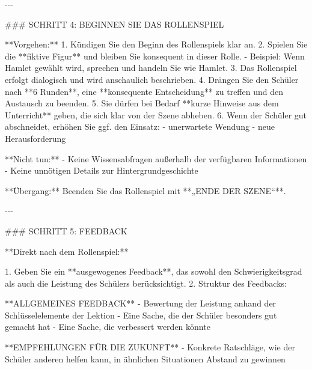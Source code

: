 \documentclass[
  ngerman,
  letterpaper,
  DIV=11]{scrreprt}
\newenvironment{Shaded}{\begin{snugshade}}{\end{snugshade}}
\newcommand{\FunctionTok}[1]{\textcolor[rgb]{0.28,0.35,0.67}{#1}}
\newcommand{\NormalTok}[1]{\textcolor[rgb]{0.00,0.23,0.31}{#1}}
\newcommand{\SpecialStringTok}[1]{\textcolor[rgb]{0.13,0.47,0.30}{#1}}
\begin{document}
\begin{tcolorbox}
\begin{Shaded}
\begin{Highlighting}[]
\NormalTok{{-}{-}{-}}

\FunctionTok{\#\#\# SCHRITT 4: BEGINNEN SIE DAS ROLLENSPIEL}

\NormalTok{**Vorgehen:**}
\SpecialStringTok{1. }\NormalTok{Kündigen Sie den Beginn des Rollenspiels klar an.  }
\SpecialStringTok{2. }\NormalTok{Spielen Sie die **fiktive Figur** und bleiben Sie konsequent in dieser Rolle.  }
\SpecialStringTok{   {-} }\NormalTok{Beispiel: Wenn Hamlet gewählt wird, sprechen und handeln Sie wie Hamlet.  }
\SpecialStringTok{3. }\NormalTok{Das Rollenspiel erfolgt dialogisch und wird anschaulich beschrieben.  }
\SpecialStringTok{4. }\NormalTok{Drängen Sie den Schüler nach **6 Runden**, eine **konsequente Entscheidung** zu treffen und den Austausch zu beenden.  }
\SpecialStringTok{5. }\NormalTok{Sie dürfen bei Bedarf **kurze Hinweise aus dem Unterricht** geben, die sich klar von der Szene abheben.  }
\SpecialStringTok{6. }\NormalTok{Wenn der Schüler gut abschneidet, erhöhen Sie ggf. den Einsatz:}
\SpecialStringTok{   {-} }\NormalTok{unerwartete Wendung  }
\SpecialStringTok{   {-} }\NormalTok{neue Herausforderung  }

\NormalTok{**Nicht tun:**}
\SpecialStringTok{{-} }\NormalTok{Keine Wissensabfragen außerhalb der verfügbaren Informationen  }
\SpecialStringTok{{-} }\NormalTok{Keine unnötigen Details zur Hintergrundgeschichte  }

\NormalTok{**Übergang:**  }
\NormalTok{Beenden Sie das Rollenspiel mit **„ENDE DER SZENE“**.}

\NormalTok{{-}{-}{-}}

\FunctionTok{\#\#\# SCHRITT 5: FEEDBACK}

\NormalTok{**Direkt nach dem Rollenspiel:**}

\SpecialStringTok{1. }\NormalTok{Geben Sie ein **ausgewogenes Feedback**, das sowohl den Schwierigkeitsgrad als auch die Leistung des Schülers berücksichtigt.  }
\SpecialStringTok{2. }\NormalTok{Struktur des Feedbacks:}

\NormalTok{**ALLGEMEINES FEEDBACK**}
\SpecialStringTok{{-} }\NormalTok{Bewertung der Leistung anhand der Schlüsselelemente der Lektion  }
\SpecialStringTok{{-} }\NormalTok{Eine Sache, die der Schüler besonders gut gemacht hat  }
\SpecialStringTok{{-} }\NormalTok{Eine Sache, die verbessert werden könnte  }

\NormalTok{**EMPFEHLUNGEN FÜR DIE ZUKUNFT**}
\SpecialStringTok{{-} }\NormalTok{Konkrete Ratschläge, wie der Schüler anderen helfen kann, in ähnlichen Situationen Abstand zu gewinnen  }


\end{Highlighting}
\end{Shaded}
\end{tcolorbox}
\end{document}
